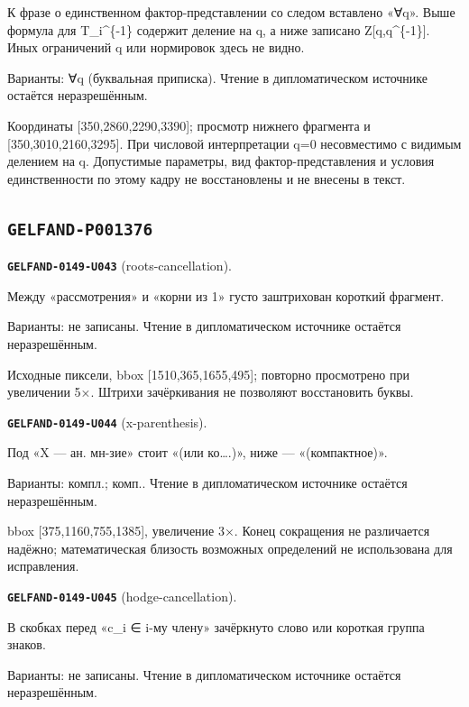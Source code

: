 \documentclass[11pt]{article}
\theoremstyle{definition}
\theoremstyle{remark}
\begin{document}
К фразе о единственном фактор-представлении со следом вставлено «∀q». Выше формула для T\_i\textasciicircum{}\{-1\} содержит деление на q, а ниже записано Z[q,q\textasciicircum{}\{-1\}]. Иных ограничений q или нормировок здесь не видно.\par
Варианты: ∀q (буквальная приписка). Чтение в дипломатическом источнике остаётся неразрешённым.\par
Координаты [350,2860,2290,3390]; просмотр нижнего фрагмента и [350,3010,2160,3295]. При числовой интерпретации q=0 несовместимо с видимым делением на q. Допустимые параметры, вид фактор-представления и условия единственности по этому кадру не восстановлены и не внесены в текст.\par\medskip

\subsection*{\texttt{GELFAND-P001376}}
\noindent\leavevmode{}\label{GELFAND-P001376:roots-cancellation:note}\textbf{\texttt{GELFAND-0149-U043}} (roots-cancellation).\par\nopagebreak[4]
Между «рассмотрения» и «корни из 1» густо заштрихован короткий фрагмент.\par
Варианты: не записаны. Чтение в дипломатическом источнике остаётся неразрешённым.\par
Исходные пиксели, bbox [1510,365,1655,495]; повторно просмотрено при увеличении 5×. Штрихи зачёркивания не позволяют восстановить буквы.\par\medskip
\noindent\leavevmode{}\label{GELFAND-P001376:x-parenthesis:note}\textbf{\texttt{GELFAND-0149-U044}} (x-parenthesis).\par\nopagebreak[4]
Под «X — ан. мн-зие» стоит «(или ко….)», ниже — «(компактное)».\par
Варианты: компл.; комп.. Чтение в дипломатическом источнике остаётся неразрешённым.\par
bbox [375,1160,755,1385], увеличение 3×. Конец сокращения не различается надёжно; математическая близость возможных определений не использована для исправления.\par\medskip
\noindent\leavevmode{}\label{GELFAND-P001376:hodge-cancellation:note}\textbf{\texttt{GELFAND-0149-U045}} (hodge-cancellation).\par\nopagebreak[4]
В скобках перед «c\_i ∈ i-му члену» зачёркнуто слово или короткая группа знаков.\par
Варианты: не записаны. Чтение в дипломатическом источнике остаётся неразрешённым.\par
\end{document}
